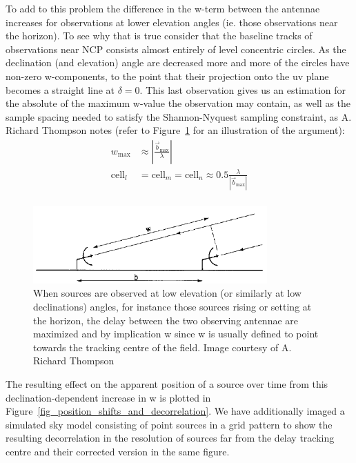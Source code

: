 To add to this problem the difference in the w-term between the antennae increases for observations at lower elevation angles (ie. those observations near the horizon). To see why that
is true consider that the baseline tracks of observations near NCP consists almost entirely of level concentric circles. As the declination (and elevation) angle are decreased 
more and more of the circles have non-zero w-components, to the point that their projection onto the uv plane becomes a straight line at $\delta=0$. This last observation
gives us an estimation for the absolute of the maximum w-value the observation may contain, as well as the sample spacing needed to satisfy the Shannon-Nyquest sampling constraint, 
as A. Richard Thompson \cite[Lecture 2]{taylor1999synthesis} notes (refer to Figure~\ref{fig_max_baseline} for an illustration of the argument):
\begin{equation}
 \label{eqn_wmax}
 \begin{split}
  w_{\text{max}} &\approx |\frac{\vec{b}_{\text{max}}}{\lambda}|\\
  \text{cell}_l &= \text{cell}_m = \text{cell}_n \approx 0.5\frac{\lambda}{|\vec{b}_{\text{max}}|}\\
 \end{split}
\end{equation}

\begin{figure}[h!]
  \begin{mdframed}
    \centering
    \includegraphics[width=0.8\textwidth]{images/max_w.png}
    \caption[Maximum w-estimation at low azimuth angle observation]{When sources are observed at low elevation (or similarly at low declinations) angles,
    for instance those sources rising or setting at the horizon, the delay between the two observing antennae are maximized and by implication w since w is usually
    defined to point towards the tracking centre of the field. Image courtesy of A. Richard Thompson \cite[Lecture 2]{taylor1999synthesis}}
    \label{fig_max_baseline}
  \end{mdframed}
\end{figure}

The resulting effect on the apparent position of a source over time from this declination-dependent increase in w is plotted in Figure~\ref{fig_position_shifts_and_decorrelation}. We have 
additionally imaged a simulated sky model consisting of point sources in a grid pattern to show the resulting decorrelation in the resolution of sources far from the delay tracking centre 
and their corrected version in the same figure.

